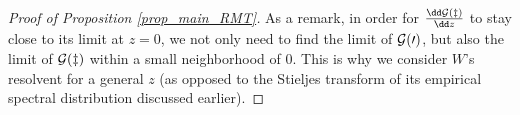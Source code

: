 \documentclass[aos,preprint]{imsart}
\begin{document}
\begin{proof}[Proof of Proposition \ref{prop_main_RMT}]
As a remark, in order for $\frac{\dd \cal G(z)}{\dd z}$ to stay close to its limit at $z = 0$, we not only need to find the limit of $\cal G(0)$, but also the limit of $\cal G(z)$ within a small neighborhood of $0$.
This is why we consider $W$'s resolvent for a general $z$ (as opposed to the Stieljes transform of its empirical spectral distribution discussed earlier).

\end{proof}
\end{document}
